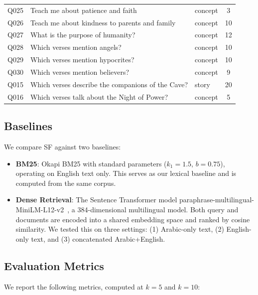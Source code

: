 \documentclass[conference]{IEEEtran}
\begin{document}
\begin{table}[t]
\begin{tabular}{cllc}
    Q025 & Teach me about patience and faith & concept & 3 \\
    Q026 & Teach me about kindness to parents and family & concept & 10 \\
    Q027 & What is the purpose of humanity? & concept & 12 \\
    Q028 & Which verses mention angels? & concept & 10 \\
    Q029 & Which verses mention hypocrites? & concept & 10 \\
    Q030 & Which verses mention believers? & concept & 9 \\
    \midrule
    Q015 & Which verses describe the companions of the Cave? & story & 20 \\
    Q016 & Which verses talk about the Night of Power? & concept & 5 \\
    \bottomrule
  \end{tabular}
\end{table}

\subsection{Baselines}

We compare SF against two baselines:

\begin{itemize}
  \item \textbf{BM25}: Okapi BM25 with standard parameters ($k_1=1.5$,
        $b=0.75$), operating on English text only. This serves as our
        lexical baseline and is computed from the same corpus.
  \item \textbf{Dense Retrieval}: The Sentence Transformer model
        paraphrase-multilingual-MiniLM-L12-v2~\cite{reimers2019sentence},
        a 384-dimensional multilingual model. Both query and documents
        are encoded into a shared embedding space and ranked by cosine
        similarity. We tested this on three settings: (1) Arabic-only
        text, (2) English-only text, and (3) concatenated Arabic+English.
\end{itemize}

\subsection{Evaluation Metrics}

We report the following metrics, computed at $k=5$ and $k=10$:
\end{document}
